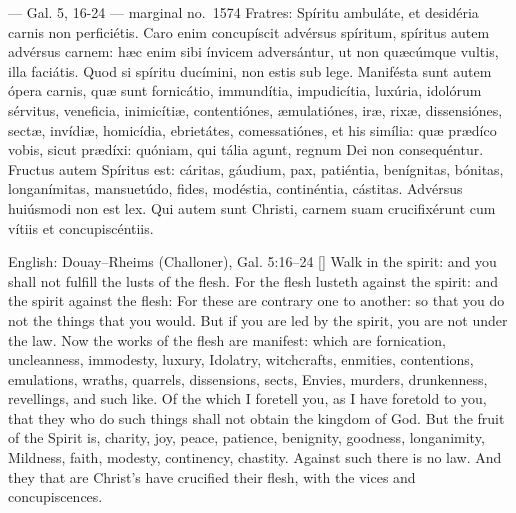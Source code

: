\begin{appointedlatin}{ --- Gal. 5, 16-24 --- marginal no.\ 1574}
Fratres: Spíritu ambuláte, et desidéria carnis non perficiétis. Caro enim
concupíscit advérsus spíritum, spíritus autem advérsus carnem: hæc enim sibi
ínvicem adversántur, ut non quæcúmque vultis, illa faciátis. Quod si spíritu
ducímini, non estis sub lege. Manifésta sunt autem ópera carnis, quæ sunt
fornicátio, immundítia, impudicítia, luxúria, idolórum sérvitus, veneficia,
inimicítiæ, contentiónes, æmulatiónes, iræ, rixæ, dissensiónes, sectæ,
invídiæ, homicídia, ebrietátes, comessatiónes, et his simília: quæ prædíco
vobis, sicut prædíxi: quóniam, qui tália agunt, regnum Dei non consequéntur.
Fructus autem Spíritus est: cáritas, gáudium, pax, patiéntia, benígnitas,
bónitas, longanímitas, mansuetúdo, fides, modéstia, continéntia, cástitas.
Advérsus huiúsmodi non est lex. Qui autem sunt Christi, carnem suam
crucifixérunt cum vítiis et concupiscéntiis.
\end{appointedlatin}

\begin{namedtranslation}{English: Douay--Rheims (Challoner), Gal. 5:16--24}
[] Walk in the spirit: and you shall not fulfill the lusts of
the flesh. For the flesh lusteth against the spirit: and the spirit against the
flesh: For these are contrary one to another: so that you do not the things
that you would. But if you are led by the spirit, you are not under the law.
Now the works of the flesh are manifest: which are fornication, uncleanness,
immodesty, luxury, Idolatry, witchcrafts, enmities, contentions, emulations,
wraths, quarrels, dissensions, sects, Envies, murders, drunkenness, revellings,
and such like. Of the which I foretell you, as I have foretold to you, that
they who do such things shall not obtain the kingdom of God. But the fruit of
the Spirit is, charity, joy, peace, patience, benignity, goodness, longanimity,
Mildness, faith, modesty, continency, chastity. Against such there is no law.
And they that are Christ's have crucified their flesh, with the vices and
concupiscences.
\end{namedtranslation}


